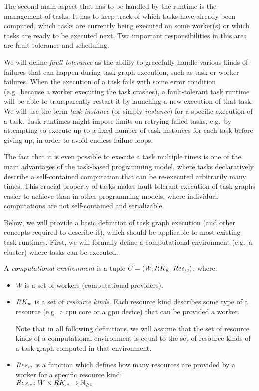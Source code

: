The second main aspect that has to be handled by the runtime is the management of tasks. It has to
keep track of which tasks have already been computed, which tasks are currently being executed on
some worker(s) or which tasks are ready to be executed next. Two important responsibilities in this
area are fault tolerance and scheduling.

We will define \emph{fault tolerance} as the ability to gracefully handle various kinds of
failures that can happen during task graph execution, such as task or worker failures. When the
execution of a task fails with some error condition (e.g.\ because a worker executing the task
crashes), a fault-tolerant task runtime will be able to transparently restart it by launching a new
execution of that task. We will use the term \emph{task instance} (or simply \emph{instance}) for a specific execution of a
task. Task runtimes might impose limits on retrying failed tasks, e.g.\ by attempting to execute up
to a fixed number of task instances for each task before giving up, in order to avoid endless
failure loops.

The fact that it is even possible to execute a task multiple times is one of the main advantages of
the task-based programming model, where tasks declaratively describe a self-contained computation
that can be re-executed arbitrarily many times. This crucial property of tasks makes fault-tolerant
execution of task graphs easier to achieve than in other programming models, where individual
computations are not self-contained and serializable.

Below, we will provide a basic definition of task graph execution (and other concepts required to
describe it), which should be applicable to most existing task runtimes. First, we will formally
define a computational environment (e.g.\ a cluster) where tasks can be executed.

\vspace{2mm} A \emph{computational environment}
is a tuple $C = (W, RK_w, Res_w)$, where:
\begin{itemize}[itemsep=0pt]
	\item $W$ is a set of workers (computational providers).
	\item $RK_w$ is a set of \emph{resource kinds}. Each resource kind
	      describes some type of a resource (e.g.\ a \gls{cpu} core or a \gls{gpu} device) that
		  can be provided a worker.

	      Note that in all following definitions, we will assume that the set of resource kinds
		  of a computational environment is equal to the set of resource kinds of a task graph
		  computed in that environment.
	\item $Res_w$ is a function which defines how many resources are
	      provided by a worker for a specific resource kind: \\ $Res_w\colon W \times RK_w \rightarrow
		      \mathbb{N}_{\geq{}0}$
\end{itemize}

